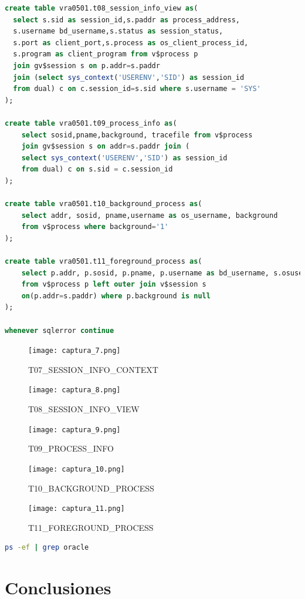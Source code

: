 \documentclass[journal]{IEEEtran}
\begin{document}
\begin{lstlisting}[language=sql, caption=s-04-procesos.sql,label={lst:codigo6}]
create table vra0501.t08_session_info_view as(
  select s.sid as session_id,s.paddr as process_address,
  s.username bd_username,s.status as session_status,
  s.port as client_port,s.process as os_client_process_id, 
  s.program as client_program from v$process p 
  join gv$session s on p.addr=s.paddr 
  join (select sys_context('USERENV','SID') as session_id
  from dual) c on c.session_id=s.sid where s.username = 'SYS'
);

create table vra0501.t09_process_info as(
    select sosid,pname,background, tracefile from v$process
	join gv$session s on addr=s.paddr join ( 
    select sys_context('USERENV','SID') as session_id
    from dual) c on s.sid = c.session_id 
);

create table vra0501.t10_background_process as(
    select addr, sosid, pname,username as os_username, background 
    from v$process where background='1'
);

create table vra0501.t11_foreground_process as(
    select p.addr, p.sosid, p.pname, p.username as bd_username, s.osuser as os_username, p.background 
    from v$process p left outer join v$session s 
    on(p.addr=s.paddr) where p.background is null
);

whenever sqlerror continue
\end{lstlisting}
\begin{figure}[H]
  \centering
  \texttt{[image: captura\_7.png]}
   \caption{T07\_SESSION\_INFO\_CONTEXT}
   \label{fig:validador_7}
\end{figure}
\begin{figure}[H]
  \centering
  \texttt{[image: captura\_8.png]}
   \caption{T08\_SESSION\_INFO\_VIEW}
   \label{fig:validador_8}
\end{figure}
\begin{figure}[H]
  \centering
  \texttt{[image: captura\_9.png]}
   \caption{T09\_PROCESS\_INFO}
   \label{fig:validador_9}
\end{figure}
\begin{figure}[H]
  \centering
  \texttt{[image: captura\_10.png]}
   \caption{T10\_BACKGROUND\_PROCESS}
   \label{fig:validador_10}
\end{figure}
\begin{figure}[H]
  \centering
  \texttt{[image: captura\_11.png]}
   \caption{T11\_FOREGROUND\_PROCESS}
   \label{fig:validador_11}
\end{figure}
\begin{lstlisting}[language=bash, caption=instrucciones SO,label={lst:codigo7}]
ps -ef | grep oracle
\end{lstlisting}
\section{Conclusiones}
\ifCLASSOPTIONcaptionsoff
  \newpage

\fi
\end{document}
